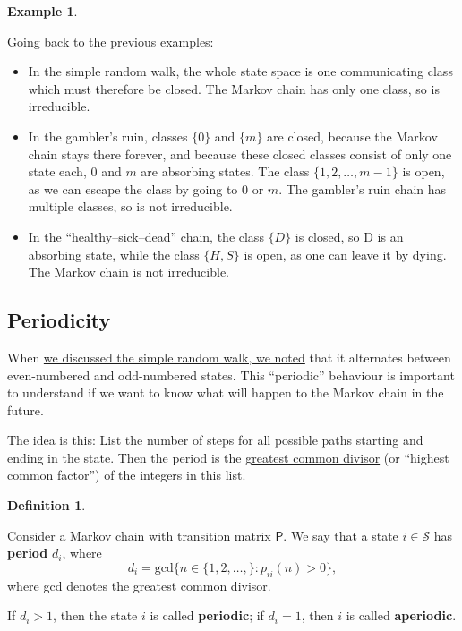 \documentclass[
  a4paper,
]{article}
\providecommand{\tightlist}{%
  \setlength{\itemsep}{0pt}\setlength{\parskip}{0pt}}
\theoremstyle{definition}
\newtheorem{definition}{Definition}[section]
\theoremstyle{definition}
\newtheorem{example}{Example}[section]
\theoremstyle{definition}
\theoremstyle{remark}
\begin{document}
\begin{example}
\protect\hypertarget{exm:ex-irred}{}\label{exm:ex-irred}

Going back to the previous examples:

\begin{itemize}
\tightlist
\item
  In the simple random walk, the whole state space is one communicating class which must therefore be closed. The Markov chain has only one class, so is irreducible.
\item
  In the gambler's ruin, classes \(\{0\}\) and \(\{m\}\) are closed, because the Markov chain stays there forever, and because these closed classes consist of only one state each, \(0\) and \(m\) are absorbing states. The class \(\{1, 2, \dots, m-1\}\) is open, as we can escape the class by going to \(0\) or \(m\). The gambler's ruin chain has multiple classes, so is not irreducible.
\item
  In the ``healthy--sick--dead'' chain, the class \(\{D\}\) is closed, so D is an absorbing state, while the class \(\{H, S\}\) is open, as one can leave it by dying. The Markov chain is not irreducible.
\end{itemize}

\end{example}

\hypertarget{periodicity}{%
\subsection{Periodicity}\label{periodicity}}

When \protect\hyperlink{S02-exact-distribution}{we discussed the simple random walk, we noted} that it alternates between even-numbered and odd-numbered states. This ``periodic'' behaviour is important to understand if we want to know what will happen to the Markov chain in the future.

The idea is this: List the number of steps for all possible paths starting and ending in the state. Then the period is the \href{https://en.wikipedia.org/wiki/Greatest_common_divisor}{greatest common divisor} (or ``highest common factor'') of the integers in this list.

\begin{definition}
\protect\hypertarget{def:period}{}\label{def:period}

Consider a Markov chain with transition matrix \(\mathsf P\). We say that a state \(i\in\mathcal{S}\) has \textbf{period} \(d_i\), where
\[ d_i=\text{gcd}\big\{n\in\{1,2,\dots,\} : p_{ii}(n) > 0\big\} , \]
where gcd denotes the greatest common divisor.

If \(d_i>1\), then the state \(i\) is called \textbf{periodic}; if \(d_i = 1\), then \(i\) is called \textbf{aperiodic}.

\end{definition}
\end{document}
